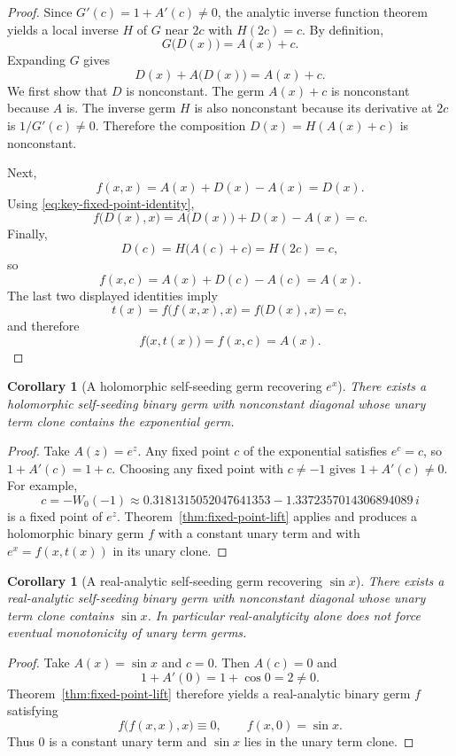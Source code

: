 \documentclass[11pt]{amsart}
\numberwithin{equation}{section}
\newtheorem{corollary}[theorem]{Corollary}
\theoremstyle{remark}
\theoremstyle{definition}
\begin{document}
\begin{proof}
Since $G'(c)=1+A'(c)\neq 0$, the analytic inverse function theorem yields a local inverse $H$ of $G$ near $2c$ with $H(2c)=c$. By definition,
\[
G\bigl(D(x)\bigr)=A(x)+c.
\]
Expanding $G$ gives
\begin{equation}\label{eq:key-fixed-point-identity}
D(x)+A\bigl(D(x)\bigr)=A(x)+c.
\end{equation}
We first show that $D$ is nonconstant. The germ $A(x)+c$ is nonconstant because $A$ is. The inverse germ $H$ is also nonconstant because its derivative at $2c$ is $1/G'(c)\neq 0$. Therefore the composition $D(x)=H(A(x)+c)$ is nonconstant.

Next,
\[
f(x,x)=A(x)+D(x)-A(x)=D(x).
\]
Using \eqref{eq:key-fixed-point-identity},
\[
f\bigl(D(x),x\bigr)=A\bigl(D(x)\bigr)+D(x)-A(x)=c.
\]
Finally,
\[
D(c)=H\bigl(A(c)+c\bigr)=H(2c)=c,
\]
so
\[
f(x,c)=A(x)+D(c)-A(c)=A(x).
\]
The last two displayed identities imply
\[
t(x)=f\bigl(f(x,x),x\bigr)=f\bigl(D(x),x\bigr)=c,
\]
and therefore
\[
f\bigl(x,t(x)\bigr)=f(x,c)=A(x).
\]
\end{proof}

\begin{corollary}[A holomorphic self-seeding germ recovering $e^x$]\label{cor:exp-fixed-point}
There exists a holomorphic self-seeding binary germ with nonconstant diagonal whose unary term clone contains the exponential germ.
\end{corollary}

\begin{proof}
Take $A(z)=e^z$. Any fixed point $c$ of the exponential satisfies $e^c=c$, so $1+A'(c)=1+c$. Choosing any fixed point with $c\neq -1$ gives $1+A'(c)\neq 0$. For example,
\[
c=-W_0(-1)\approx 0.3181315052047641353-1.3372357014306894089\,i
\]
is a fixed point of $e^z$. Theorem~\ref{thm:fixed-point-lift} applies and produces a holomorphic binary germ $f$ with a constant unary term and with $e^x=f(x,t(x))$ in its unary clone.
\end{proof}

\begin{corollary}[A real-analytic self-seeding germ recovering $\sin x$]\label{cor:sin-example}
There exists a real-analytic self-seeding binary germ with nonconstant diagonal whose unary term clone contains $\sin x$. In particular real-analyticity alone does not force eventual monotonicity of unary term germs.
\end{corollary}

\begin{proof}
Take $A(x)=\sin x$ and $c=0$. Then $A(c)=0$ and
\[
1+A'(0)=1+\cos 0=2\neq 0.
\]
Theorem~\ref{thm:fixed-point-lift} therefore yields a real-analytic binary germ $f$ satisfying
\[
f\bigl(f(x,x),x\bigr)\equiv 0,\qquad f(x,0)=\sin x.
\]
Thus $0$ is a constant unary term and $\sin x$ lies in the unary term clone.
\end{proof}
\end{document}
